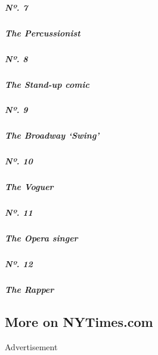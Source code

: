 \href{https://www.nytimes3xbfgragh.onion/interactive/2019/05/30/magazine/latin-beat-new-york.html}{}

\hypertarget{nuxba-7}{%
\subparagraph{Nº. 7}\label{nuxba-7}}

\hypertarget{the-percussionist}{%
\subparagraph{The Percussionist}\label{the-percussionist}}

\href{https://www.nytimes3xbfgragh.onion/interactive/2019/05/30/magazine/female-comedy-new-york.html}{}

\hypertarget{nuxba-8}{%
\subparagraph{Nº. 8}\label{nuxba-8}}

\hypertarget{the-stand-up-comic}{%
\subparagraph{The Stand-up comic}\label{the-stand-up-comic}}

\href{https://www.nytimes3xbfgragh.onion/interactive/2019/05/30/magazine/aladdin-musical-new-york.html}{}

\hypertarget{nuxba-9}{%
\subparagraph{Nº. 9}\label{nuxba-9}}

\hypertarget{the-broadway-swing}{%
\subparagraph{The Broadway `Swing'}\label{the-broadway-swing}}

\href{https://www.nytimes3xbfgragh.onion/interactive/2019/05/30/magazine/vogue-kiki-new-york.html}{}

\hypertarget{nuxba-10}{%
\subparagraph{Nº. 10}\label{nuxba-10}}

\hypertarget{the-voguer}{%
\subparagraph{The Voguer}\label{the-voguer}}

\href{https://www.nytimes3xbfgragh.onion/interactive/2019/05/30/magazine/metropolitan-opera-singer-new-york.html}{}

\hypertarget{nuxba-11}{%
\subparagraph{Nº. 11}\label{nuxba-11}}

\hypertarget{the-opera-singer}{%
\subparagraph{The Opera singer}\label{the-opera-singer}}

\href{https://www.nytimes3xbfgragh.onion/interactive/2019/05/30/magazine/princess-nokia-new-york.html}{}

\hypertarget{nuxba-12}{%
\subparagraph{Nº. 12}\label{nuxba-12}}

\hypertarget{the-rapper}{%
\subparagraph{The Rapper}\label{the-rapper}}

\hypertarget{more-on-nytimescom}{%
\subsection{More on NYTimes.com}\label{more-on-nytimescom}}

Advertisement

